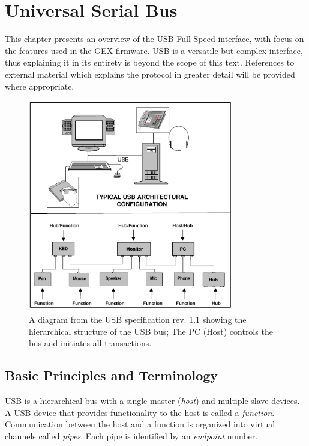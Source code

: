 \chapter{Universal Serial Bus}

This chapter presents an overview of the \gls{USB} Full Speed interface, with focus on the features used in the GEX firmware. \gls{USB} is a versatile but complex interface, thus explaining it in its entirety is beyond the scope of this text. References to external material which explains the protocol in greater detail will be provided where appropriate.

\begin{figure}[H]
	\centering
	\includegraphics[width=0.8\textwidth] {img/usb-hierarchy.png}
	\caption[USB hierarchical structure]{\label{fig:usb-hierarchy}A diagram from the USB specification rev. 1.1 showing the hierarchical structure of the USB bus; The PC (Host) controls the bus and initiates all transactions.}
\end{figure}

\section{Basic Principles and Terminology}


\gls{USB} is a hierarchical bus with a single master (\textit{host}) and multiple slave devices. A \gls{USB} device that provides functionality to the host is called a \textit{function}. Communication between the host and a function is organized into virtual channels called \textit{pipes}. Each pipe is identified by an \textit{endpoint} number.

